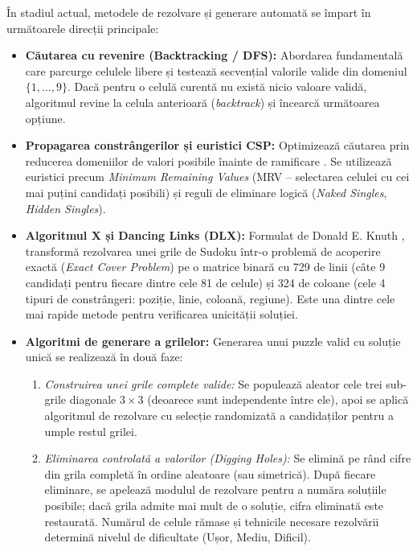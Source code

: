 În stadiul actual, metodele de rezolvare și generare automată se împart în următoarele direcții principale:
\begin{itemize}
    \item \textbf{Căutarea cu revenire (Backtracking / DFS):} Abordarea fundamentală care parcurge celulele libere și testează secvențial valorile valide din domeniul $\{1, \dots, 9\}$. Dacă pentru o celulă curentă nu există nicio valoare validă, algoritmul revine la celula anterioară (\textit{backtrack}) și încearcă următoarea opțiune.
    \item \textbf{Propagarea constrângerilor și euristici CSP:} Optimizează căutarea prin reducerea domeniilor de valori posibile înainte de ramificare \cite{norvig2006}. Se utilizează euristici precum \textit{Minimum Remaining Values} (MRV -- selectarea celulei cu cei mai puțini candidați posibili) și reguli de eliminare logică (\textit{Naked Singles}, \textit{Hidden Singles}).
    \item \textbf{Algoritmul X și Dancing Links (DLX):} Formulat de Donald E. Knuth \cite{knuth2000}, transformă rezolvarea unei grile de Sudoku într-o problemă de acoperire exactă (\textit{Exact Cover Problem}) pe o matrice binară cu 729 de linii (câte 9 candidați pentru fiecare dintre cele 81 de celule) și 324 de coloane (cele 4 tipuri de constrângeri: poziție, linie, coloană, regiune). Este una dintre cele mai rapide metode pentru verificarea unicității soluției.
    \item \textbf{Algoritmi de generare a grilelor:} Generarea unui puzzle valid cu soluție unică se realizează în două faze:
    \begin{enumerate}
        \item \textit{Construirea unei grile complete valide:} Se populează aleator cele trei sub-grile diagonale $3 \times 3$ (deoarece sunt independente între ele), apoi se aplică algoritmul de rezolvare cu selecție randomizată a candidaților pentru a umple restul grilei.
        \item \textit{Eliminarea controlată a valorilor (Digging Holes):} Se elimină pe rând cifre din grila completă în ordine aleatoare (sau simetrică). După fiecare eliminare, se apelează modulul de rezolvare pentru a număra soluțiile posibile; dacă grila admite mai mult de o soluție, cifra eliminată este restaurată. Numărul de celule rămase și tehnicile necesare rezolvării determină nivelul de dificultate (Ușor, Mediu, Dificil).
    \end{enumerate}
\end{itemize}

